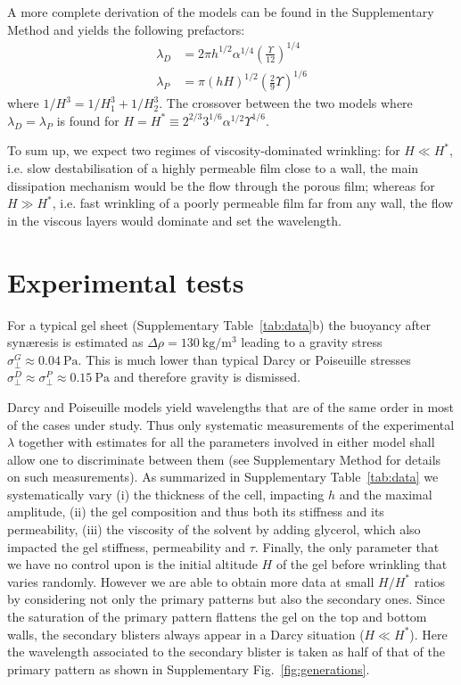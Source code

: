 \documentclass[twocolumn,superscriptaddress,showpacs,preprintnumbers,
amsmath,amssymb,prl]{revtex4-1}
\begin{document}
A more complete derivation of the models can be found in the Supplementary Method and yields the following prefactors:
\begin{align}
\lambda_D &= 2\pi h^{1/2}\alpha^{1/4}\left(\frac{\Upsilon}{12}\right)^{1/4}\\
\lambda_P &= \pi (hH)^{1/2}\left(\frac{2}{9}\Upsilon\right)^{1/6}
\end{align}
where $1/H^3 = 1/H_1^3 + 1/H_2^3$. The crossover between the two models where $\lambda_D=\lambda_P$ is found for $H = H^* \equiv 2^{2/3} 3^{1/6} \alpha^{1/2} \Upsilon^{1/6}$.

To sum up, we expect two regimes of viscosity-dominated wrinkling: for $H\ll H^*$, i.e. slow destabilisation of a highly permeable film close to a wall, the main dissipation mechanism would be the flow through the porous film; whereas for $H\gg H^*$, i.e. fast wrinkling of a poorly permeable film far from any wall, the flow in the viscous layers would dominate and set the wavelength.

\section*{Experimental tests}

For a typical gel sheet (Supplementary Table~\ref{tab:data}b) the buoyancy after syn\ae{}resis is estimated as $\Delta\rho=\SI{130}{\kilo\gram\per\cubic\metre}$ leading to a gravity stress $\sigma_\perp^G \approx \SI{0.04}{\pascal}$. This is much lower than typical Darcy or Poiseuille stresses $\sigma_\perp^D \approx \sigma_\perp^P \approx \SI{0.15}{\pascal}$ and therefore gravity is dismissed.


Darcy and Poiseuille models yield wavelengths that are of the same order in most of the cases under study. Thus only systematic measurements of the experimental $\lambda$ together with estimates for all the parameters involved in either model shall allow one to discriminate between them (see Supplementary Method for details on such measurements). As summarized in Supplementary Table~\ref{tab:data} we systematically vary (i) the thickness of the cell, impacting $h$ and the maximal amplitude, (ii) the gel composition and thus both its stiffness and its permeability, (iii) the viscosity of the solvent by adding glycerol, which also impacted the gel stiffness, permeability and $\tau$. Finally, the only parameter that we have no control upon is the initial altitude $H$ of the gel before wrinkling that varies randomly. However we are able to obtain more data at small $H/H^*$ ratios by considering not only the primary patterns but also the secondary ones. Since the saturation of the primary pattern flattens the gel on the top and bottom walls, the secondary blisters always appear in a Darcy situation ($H\ll H^*$). Here the wavelength associated to the secondary blister is taken as half of that of the primary pattern as shown in Supplementary Fig.~\ref{fig:generations}.
\end{document}
